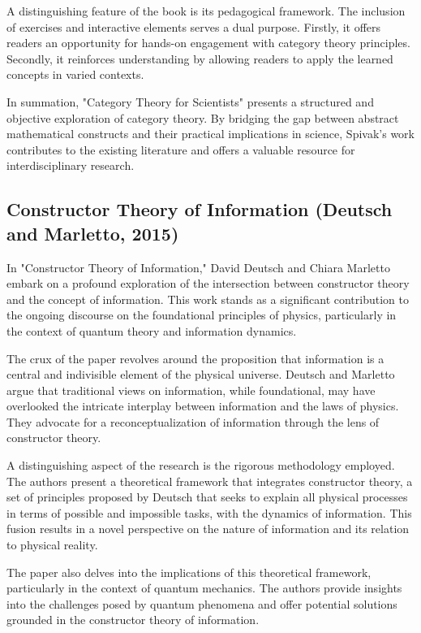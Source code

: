 \documentclass[sn-nature]{sn-jnl}%
\theoremstyle{thmstyleone}%
\theoremstyle{thmstyletwo}%
\theoremstyle{thmstylethree}%
\begin{document}
A distinguishing feature of the book is its pedagogical framework. The inclusion of exercises and interactive elements serves a dual purpose. Firstly, it offers readers an opportunity for hands-on engagement with category theory principles. Secondly, it reinforces understanding by allowing readers to apply the learned concepts in varied contexts.

In summation, "Category Theory for Scientists" presents a structured and objective exploration of category theory. By bridging the gap between abstract mathematical constructs and their practical implications in science, Spivak's work contributes to the existing literature and offers a valuable resource for interdisciplinary research.
\subsection{Constructor Theory of Information (Deutsch and Marletto, 2015)\cite{deutsch_constructor_2015}}

In "Constructor Theory of Information," David Deutsch and Chiara Marletto embark on a profound exploration of the intersection between constructor theory and the concept of information. This work stands as a significant contribution to the ongoing discourse on the foundational principles of physics, particularly in the context of quantum theory and information dynamics.

The crux of the paper revolves around the proposition that information is a central and indivisible element of the physical universe. Deutsch and Marletto argue that traditional views on information, while foundational, may have overlooked the intricate interplay between information and the laws of physics. They advocate for a reconceptualization of information through the lens of constructor theory.

A distinguishing aspect of the research is the rigorous methodology employed. The authors present a theoretical framework that integrates constructor theory, a set of principles proposed by Deutsch that seeks to explain all physical processes in terms of possible and impossible tasks, with the dynamics of information. This fusion results in a novel perspective on the nature of information and its relation to physical reality.

The paper also delves into the implications of this theoretical framework, particularly in the context of quantum mechanics. The authors provide insights into the challenges posed by quantum phenomena and offer potential solutions grounded in the constructor theory of information.
\end{document}
